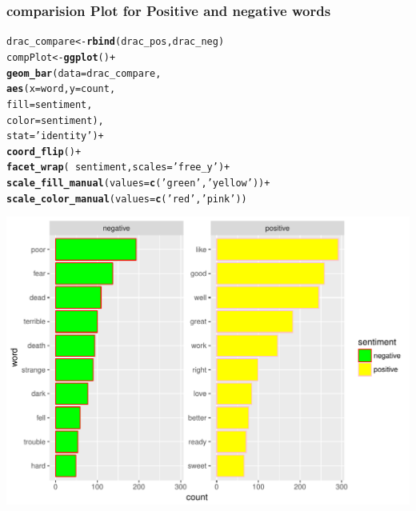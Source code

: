 \documentclass{beamer}\usepackage[]{graphicx}\usepackage[]{color}
\makeatletter
\def\maxwidth{ %
  \ifdim\Gin@nat@width>\linewidth
    \linewidth
  \else
    \Gin@nat@width
  \fi
}
\newcommand{\hlstr}[1]{\textcolor[rgb]{0.192,0.494,0.8}{#1}}%
\newcommand{\hlopt}[1]{\textcolor[rgb]{0,0,0}{#1}}%
\newcommand{\hlstd}[1]{\textcolor[rgb]{0.345,0.345,0.345}{#1}}%
\newcommand{\hlkwb}[1]{\textcolor[rgb]{0.69,0.353,0.396}{#1}}%
\newcommand{\hlkwc}[1]{\textcolor[rgb]{0.333,0.667,0.333}{#1}}%
\newcommand{\hlkwd}[1]{\textcolor[rgb]{0.737,0.353,0.396}{\textbf{#1}}}%
\newenvironment{kframe}{%
 \def\at@end@of@kframe{}%
 \ifinner\ifhmode%
  \def\at@end@of@kframe{\end{minipage}}%
  \begin{minipage}{\columnwidth}%
 \fi\fi%
 \def\FrameCommand##1{\hskip\@totalleftmargin \hskip-\fboxsep
 \colorbox{shadecolor}{##1}\hskip-\fboxsep
     \hskip-\linewidth \hskip-\@totalleftmargin \hskip\columnwidth}%
 \MakeFramed {\advance\hsize-\width
   \@totalleftmargin\z@ \linewidth\hsize
   \@setminipage}}%
 {\par\unskip\endMakeFramed%
 \at@end@of@kframe}
\newenvironment{knitrout}{}{} %
\makeatother
\begin{document}
\begin{frame}

  \frametitle{comparision Plot for Positive and negative words}
\begin{knitrout}
\color{fgcolor}\begin{kframe}
\begin{alltt}
\hlstd{drac_compare}\hlkwb{<-}\hlkwd{rbind}\hlstd{(drac_pos,drac_neg)}
\hlstd{compPlot}\hlkwb{<-}\hlkwd{ggplot}\hlstd{()}\hlopt{+}
  \hlkwd{geom_bar}\hlstd{(}\hlkwc{data}\hlstd{=drac_compare,}
           \hlkwd{aes}\hlstd{(}\hlkwc{x}\hlstd{=word,}\hlkwc{y}\hlstd{=count,}
               \hlkwc{fill}\hlstd{=sentiment,}
               \hlkwc{color}\hlstd{=sentiment),}
           \hlkwc{stat} \hlstd{=} \hlstr{'identity'}\hlstd{)}\hlopt{+}
  \hlkwd{coord_flip}\hlstd{()}\hlopt{+}
  \hlkwd{facet_wrap}\hlstd{(}\hlopt{~}\hlstd{sentiment,}\hlkwc{scales} \hlstd{=} \hlstr{'free_y'}\hlstd{)}\hlopt{+}
  \hlkwd{scale_fill_manual}\hlstd{(}\hlkwc{values}\hlstd{=}\hlkwd{c}\hlstd{(}\hlstr{'green'}\hlstd{,}\hlstr{'yellow'}\hlstd{))}\hlopt{+}
  \hlkwd{scale_color_manual}\hlstd{(}\hlkwc{values} \hlstd{=} \hlkwd{c}\hlstd{(}\hlstr{'red'}\hlstd{,}\hlstr{'pink'}\hlstd{))}
\end{alltt}
\end{kframe}
\end{knitrout}

\framebreak
\begin{knitrout}
\color{fgcolor}
\includegraphics[width=\maxwidth]{figure/unnamed-chunk-16-1} 

\end{knitrout}

  
\end{frame}
\end{document}

